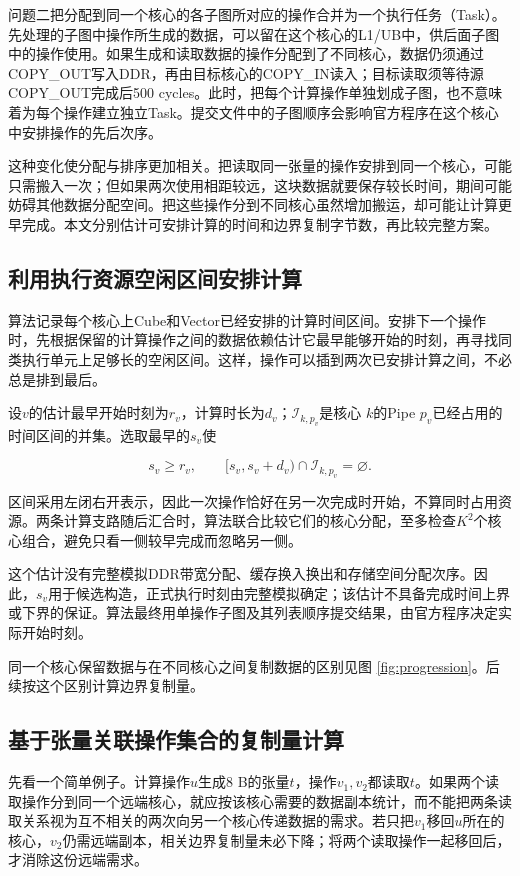 \documentclass[anonymous,notoc]{gmcm2026}
\begin{document}
问题二把分配到同一个核心的各子图所对应的操作合并为一个执行任务（Task）。先处理的子图中操作所生成的数据，可以留在这个核心的L1/UB中，供后面子图中的操作使用。如果生成和读取数据的操作分配到了不同核心，数据仍须通过COPY\_OUT写入DDR，再由目标核心的COPY\_IN读入；目标读取须等待源COPY\_OUT完成后500 cycles。此时，把每个计算操作单独划成子图，也不意味着为每个操作建立独立Task。提交文件中的子图顺序会影响官方程序在这个核心中安排操作的先后次序。

这种变化使分配与排序更加相关。把读取同一张量的操作安排到同一个核心，可能只需搬入一次；但如果两次使用相距较远，这块数据就要保存较长时间，期间可能妨碍其他数据分配空间。把这些操作分到不同核心虽然增加搬运，却可能让计算更早完成。本文分别估计可安排计算的时间和边界复制字节数，再比较完整方案。

\subsection{利用执行资源空闲区间安排计算}

算法记录每个核心上Cube和Vector已经安排的计算时间区间。安排下一个操作时，先根据保留的计算操作之间的数据依赖估计它最早能够开始的时刻，再寻找同类执行单元上足够长的空闲区间。这样，操作可以插到两次已安排计算之间，不必总是排到最后。

设\(v\)的估计最早开始时刻为\(r_v\)，计算时长为\(d_v\)；\(\mathcal I_{k,p_v}\)是核心 \(k\)的Pipe \(p_v\)已经占用的时间区间的并集。选取最早的\(s_v\)使

\[s_v\ge r_v,\qquad [s_v,s_v+d_v)\cap\mathcal I_{k,p_v}=\varnothing.\]

区间采用左闭右开表示，因此一次操作恰好在另一次完成时开始，不算同时占用资源。两条计算支路随后汇合时，算法联合比较它们的核心分配，至多检查\(K^2\)个核心组合，避免只看一侧较早完成而忽略另一侧。

这个估计没有完整模拟DDR带宽分配、缓存换入换出和存储空间分配次序。因此，\(s_v\)用于候选构造，正式执行时刻由完整模拟确定；该估计不具备完成时间上界或下界的保证。算法最终用单操作子图及其列表顺序提交结果，由官方程序决定实际开始时刻。

同一个核心保留数据与在不同核心之间复制数据的区别见图 \ref{fig:progression}。后续按这个区别计算边界复制量。

\subsection{基于张量关联操作集合的复制量计算}

先看一个简单例子。计算操作\(u\)生成8 B的张量\(t\)，操作\(v_1,v_2\)都读取\(t\)。如果两个读取操作分到同一个远端核心，就应按该核心需要的数据副本统计，而不能把两条读取关系视为互不相关的两次向另一个核心传递数据的需求。若只把\(v_1\)移回\(u\)所在的核心，\(v_2\)仍需远端副本，相关边界复制量未必下降；将两个读取操作一起移回后，才消除这份远端需求。
\end{document}
